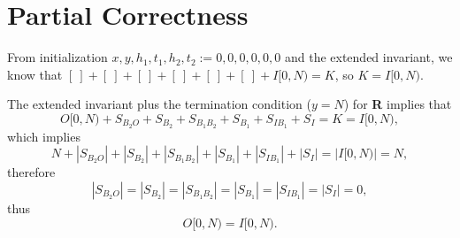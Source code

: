 \documentclass[a4paper, 11pt]{article}
\begin{document}

\section*{Partial Correctness}
From initialization $x,y,h_1,t_1,h_2,t_2:=0,0,0,0,0,0$ and the extended invariant, we know that $ [\ ] + [\ ] + [\ ] + [\ ] + [\ ] + [\ ] + I[0,N) = K $, so $ K = I[0,N) $.

The extended invariant plus the termination condition ($y=N$) for \textbf{R} implies that 
$$ O[0,N) + S_{B_2O}+S_{B_2}+S_{B_1B_2}+S_{B_1}+S_{IB_1}+S_I = K = I[0, N),$$ which implies
$$ N + |S_{B_2O}| + |S_{B_2}| + |S_{B_1B_2}| + |S_{B_1}| + |S_{IB_1}| + |S_I| = |I[0, N)| = N, $$ therefore
$$ |S_{B_2O}| = |S_{B_2}| = |S_{B_1B_2}| = |S_{B_1}| = |S_{IB_1}| = |S_I| = 0,$$ thus
$$ O[0,N) = I[0,N).$$
\end{document}
